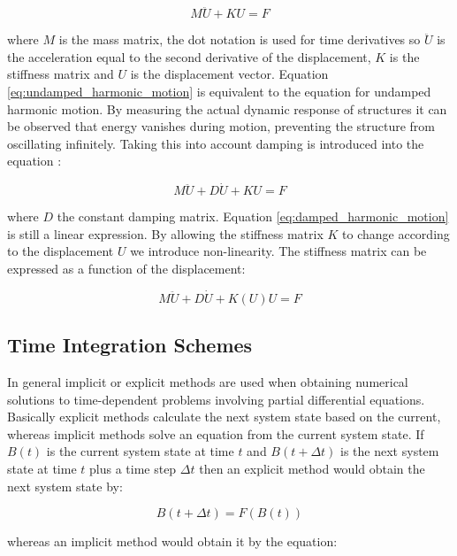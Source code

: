 \begin{equation}
\label{eq:undamped_harmonic_motion}
M \ddot{U} + K U = F
\end{equation}
  
where $M$ is the mass matrix, the dot notation is used for
time derivatives so $\ddot{U}$ is the acceleration equal
to the second derivative of the displacement, $K$ is the stiffness
matrix and $U$ is the displacement vector. Equation
\eqref{eq:undamped_harmonic_motion} is equivalent to the equation for
undamped harmonic motion. By measuring the actual dynamic response of
structures it can be observed that energy vanishes during motion,
preventing the structure from oscillating infinitely. Taking this into
account damping is introduced into the equation : 

\begin{equation}
\label{eq:damped_harmonic_motion}
M \ddot{U} + D\dot{U} + K U = F
\end{equation}

where $D$ the constant damping matrix. Equation 
\eqref{eq:damped_harmonic_motion} is still a linear expression. 
By allowing the stiffness matrix $K$ to change according to the
displacement $U$ we introduce non-linearity. The stiffness matrix
can be expressed as a function of the displacement:

\begin{equation}
\label{eq:damped_harmonic_motion_nonlinear}
M\ddot{U} + D\dot{U} + K(U)U = F
\end{equation}

\subsection{Time Integration Schemes}
In general implicit or explicit methods are used when obtaining
numerical solutions to time-dependent problems involving partial
differential equations. Basically explicit methods calculate the next
system state based on the current, whereas implicit
methods solve an equation from the current system state. If $B(t)$
is the current system state at time $t$ and 
$B(t + \Delta t)$ is the next system state at time $t$ plus a time
step $\Delta t$ then an explicit method would obtain the next 
system state by:

\begin{equation}
B(t + \Delta t) = F( B(t) )
\end{equation}

whereas an implicit method would obtain it by the equation:

